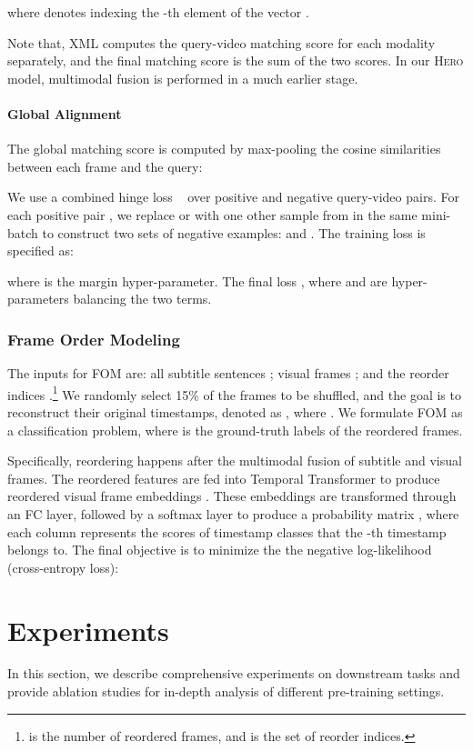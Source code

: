 \documentclass[11pt,a4paper]{article}
\begin{document}
where  denotes indexing the -th element of the vector .

Note that, XML computes the query-video matching score for each modality separately, and the final matching score is the sum of the two scores. In our \textsc{Hero} model, multimodal fusion is performed in a much earlier stage.

\paragraph{Global Alignment}
The global matching score is computed by max-pooling the cosine similarities between each frame and the query:

We use a combined hinge loss ~\citep{yu2018mattnet} over positive and negative query-video pairs. For each positive pair , we replace  or  with one other sample from in the same mini-batch to construct two sets of negative examples:  and . The training loss is specified as:

where  is the margin hyper-parameter. 
The final loss , where  and  are hyper-parameters balancing the two terms. 

\vspace{5pt}
\subsubsection{Frame Order Modeling} 
The inputs for FOM are:  all subtitle sentences ;  visual frames ; and  the reorder indices .\footnote{ is the number of reordered frames, and  is the set of reorder indices.} We randomly select 15\% of the frames to be shuffled, and the goal is to reconstruct their original timestamps, denoted as , where . We formulate FOM as a classification problem, where  is the ground-truth labels of the reordered frames. 

Specifically, reordering happens after the multimodal fusion of subtitle and visual frames.
The reordered features are fed into Temporal Transformer to produce reordered visual frame embeddings . 
These embeddings are transformed through an FC layer, followed by a softmax layer to produce a probability matrix , where each column  represents the scores of  timestamp classes that the -th timestamp belongs to. The final objective is to minimize the the negative log-likelihood (cross-entropy loss):


  \section{Experiments}
\label{exps}
 In this section, we describe comprehensive experiments on downstream tasks and provide ablation studies for in-depth analysis of different pre-training settings.
\end{document}
